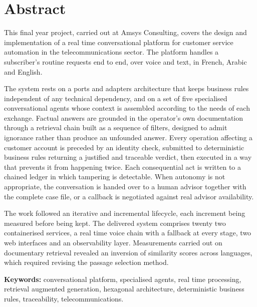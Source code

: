 \newpage

\chapter*{Abstract}
\thispagestyle{empty}

This final year project, carried out at Amsys Consulting, covers the design and implementation of a real time conversational platform for customer service automation in the telecommunications sector. The platform handles a subscriber's routine requests end to end, over voice and text, in French, Arabic and English.

The system rests on a ports and adapters architecture that keeps business rules independent of any technical dependency, and on a set of five specialised conversational agents whose context is assembled according to the needs of each exchange. Factual answers are grounded in the operator's own documentation through a retrieval chain built as a sequence of filters, designed to admit ignorance rather than produce an unfounded answer. Every operation affecting a customer account is preceded by an identity check, submitted to deterministic business rules returning a justified and traceable verdict, then executed in a way that prevents it from happening twice. Each consequential act is written to a chained ledger in which tampering is detectable. When autonomy is not appropriate, the conversation is handed over to a human advisor together with the complete case file, or a callback is negotiated against real advisor availability.

The work followed an iterative and incremental lifecycle, each increment being measured before being kept. The delivered system comprises twenty two containerised services, a real time voice chain with a fallback at every stage, two web interfaces and an observability layer. Measurements carried out on documentary retrieval revealed an inversion of similarity scores across languages, which required revising the passage selection method.

\bigskip
\noindent\textbf{Keywords:} conversational platform, specialised agents, real time processing, retrieval augmented generation, hexagonal architecture, deterministic business rules, traceability, telecommunications.
